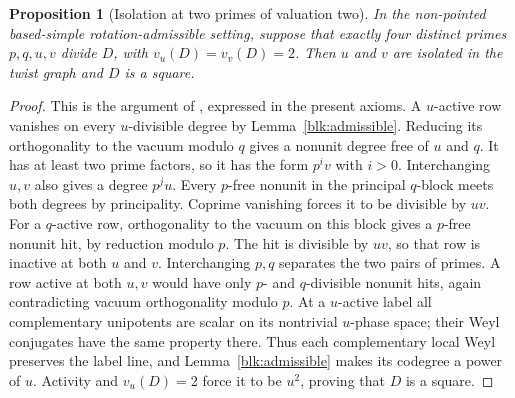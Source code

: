 \documentclass[11pt]{amsart}
\numberwithin{equation}{section}
\newtheorem{proposition}[theorem]{Proposition}
\theoremstyle{definition}
\theoremstyle{plain}
\begin{document}
\begin{proposition}[Isolation at two primes of valuation two]
\label{new:two-square-primes}
In the non-pointed based-simple rotation-admissible setting, suppose that exactly four distinct primes $p,q,u,v$ divide $D$, with
$v_u(D)=v_v(D)=2$. Then $u$ and $v$ are isolated in the twist graph
and $D$ is a square.
\end{proposition}
\begin{proof}
This is the argument of \cite[Proposition~9.3]{BDPcore}, expressed
in the present axioms. A $u$-active row vanishes on every $u$-divisible
degree by Lemma~\ref{blk:admissible}. Reducing its orthogonality to the
vacuum modulo $q$ gives a nonunit degree free of $u$ and $q$.
It has at least two prime factors, so it has the form $p^iv$ with
$i>0$. Interchanging $u,v$ also gives a degree $p^ju$.
Every $p$-free nonunit in the principal $q$-block meets both degrees
by principality. Coprime vanishing forces it to be divisible by $uv$.
For a $q$-active row, orthogonality to the vacuum on this block gives
a $p$-free nonunit hit, by reduction modulo $p$. The hit is divisible
by $uv$, so that row is inactive at both $u$ and $v$. Interchanging
$p,q$ separates the two pairs of primes. A row active at both $u,v$
would have only $p$- and $q$-divisible nonunit hits, again contradicting
vacuum orthogonality modulo $p$.
At a $u$-active label all complementary unipotents are scalar on its
nontrivial $u$-phase space; their Weyl conjugates have the same
property there. Thus each complementary local Weyl preserves the label
line, and Lemma~\ref{blk:admissible} makes its codegree a power of $u$.
Activity and $v_u(D)=2$ force it to be $u^2$, proving that $D$ is a
square.
\end{proof}
\end{document}
